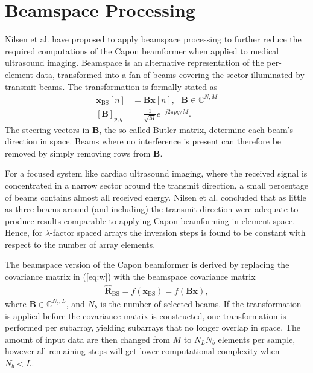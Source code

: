 \documentclass[journal]{IEEEtran}
\newcommand{\mat}[1]{\mathbf{#1}}
\renewcommand{\vec}[1]{\mathbf{#1}}
\begin{document}
\section{Beamspace Processing}\label{sec:bs}
Nilsen et al. \cite{Nilsen2009} have proposed to apply beamspace processing to further reduce the required computations of the Capon beamformer when applied to medical ultrasound imaging. Beamspace is an alternative representation of the per-element data, transformed into a fan of beams covering the sector illuminated by transmit beams. The transformation is formally stated as
\begin{align}
\vec{x}_\text{BS}[n] &= \mat{B}\vec{x}[n], \ \ \ \mat{B} \in \mathbb{C}^{N,M}\\
[\mat{B}]_{p,q} &= \frac{1}{\sqrt{M}}e^{-j 2 \pi p q / M}.
\end{align} 
The steering vectors in $\mat{B}$, the so-called Butler matrix, determine each beam's direction in space. Beams where no interference is present can therefore be removed by simply removing rows from $\mat{B}$. 

For a focused system like cardiac ultrasound imaging, where the received signal is concentrated in a narrow sector around the transmit direction, a small percentage of beams contains almost all received energy. Nilsen et al. concluded that as little as three beams around (and including) the transmit direction were adequate to produce results comparable to applying Capon beamforming in element space. Hence, for $\lambda$-factor spaced arrays the inversion steps is found to be constant with respect to the number of array elements.

The beamspace version of the Capon beamformer is derived by replacing the covariance matrix in (\ref{eq:w}) with the beamspace covariance matrix 
\begin{align}
\mat{\hat{R}}_\text{BS} = f(\vec{x}_\text{BS}) = f(\mat{B}\vec{x}), 
\end{align}
where $\mat{B} \in \mathbb{C}^{N_b,L}$, and $N_b$ is the number of selected beams. If the transformation is applied before the covariance matrix is constructed, one transformation is performed per subarray, yielding subarrays that no longer overlap in space. The amount of input data are then changed from $M$ to $N_LN_b$ elements per sample, however all remaining steps will get lower computational complexity when $N_b < L$.
\end{document}
